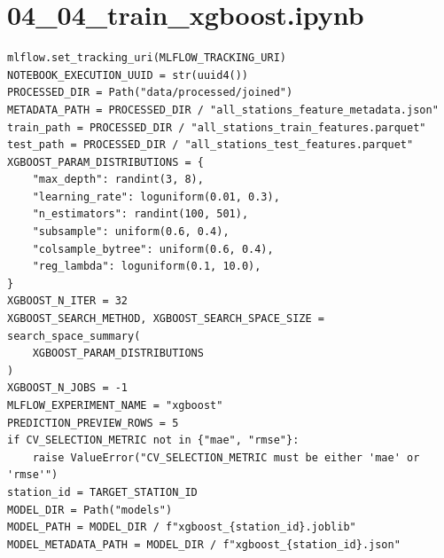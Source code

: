 \section{04\_04\_train\_xgboost.ipynb}

\begin{verbatim}
mlflow.set_tracking_uri(MLFLOW_TRACKING_URI)
NOTEBOOK_EXECUTION_UUID = str(uuid4())
PROCESSED_DIR = Path("data/processed/joined")
METADATA_PATH = PROCESSED_DIR / "all_stations_feature_metadata.json"
train_path = PROCESSED_DIR / "all_stations_train_features.parquet"
test_path = PROCESSED_DIR / "all_stations_test_features.parquet"
XGBOOST_PARAM_DISTRIBUTIONS = {
    "max_depth": randint(3, 8),
    "learning_rate": loguniform(0.01, 0.3),
    "n_estimators": randint(100, 501),
    "subsample": uniform(0.6, 0.4),
    "colsample_bytree": uniform(0.6, 0.4),
    "reg_lambda": loguniform(0.1, 10.0),
}
XGBOOST_N_ITER = 32
XGBOOST_SEARCH_METHOD, XGBOOST_SEARCH_SPACE_SIZE = search_space_summary(
    XGBOOST_PARAM_DISTRIBUTIONS
)
XGBOOST_N_JOBS = -1
MLFLOW_EXPERIMENT_NAME = "xgboost"
PREDICTION_PREVIEW_ROWS = 5
if CV_SELECTION_METRIC not in {"mae", "rmse"}:
    raise ValueError("CV_SELECTION_METRIC must be either 'mae' or 'rmse'")
station_id = TARGET_STATION_ID
MODEL_DIR = Path("models")
MODEL_PATH = MODEL_DIR / f"xgboost_{station_id}.joblib"
MODEL_METADATA_PATH = MODEL_DIR / f"xgboost_{station_id}.json"
\end{verbatim}

